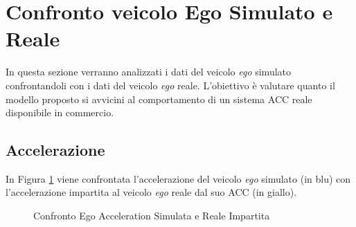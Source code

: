 \section{Confronto veicolo Ego Simulato e Reale}
In questa sezione verranno analizzati i dati del veicolo \emph{ego} simulato confrontandoli 
con i dati del veicolo \emph{ego} reale. L'obiettivo è valutare quanto il modello proposto si avvicini 
al comportamento di un sistema ACC reale disponibile in commercio.
\subsection{Accelerazione}
In Figura \ref{fig:acceleration_impartita} viene confrontata l'accelerazione del veicolo \emph{ego} simulato (in blu) 
con l'accelerazione impartita al veicolo \emph{ego} reale dal suo ACC (in giallo). 
\begin{figure}[H]
    \centering
    \caption{Confronto Ego Acceleration Simulata e Reale Impartita}
    \label{fig:acceleration_impartita}
\end{figure}

